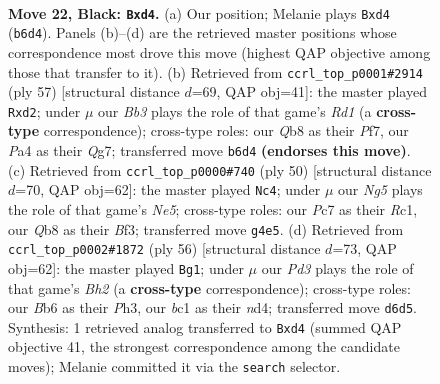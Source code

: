 \documentclass[11pt]{article}
\begin{document}
\clearpage

\begin{figure}[p]\centering
\begin{subfigure}{0.46\textwidth}\centering
\resizebox{\linewidth}{!}{%
\newchessgame
\chessboard[
  setfen={rq6/2p2kpp/1b1p4/8/pP1NQ1n1/2P5/P4PPP/1RB2K2 b - - 0 22},
  showmover=false,
  pgfstyle=straightmove, color=movearrow, markmove={b6-d4}
]}
\caption{}
\end{subfigure}\hfill
\begin{subfigure}{0.46\textwidth}\centering
\resizebox{\linewidth}{!}{%
\newchessgame
\chessboard[
  setfen={3r4/5pqk/p1n1bp1p/1p6/8/1P2QN1P/PB1R2P1/7K b - - 0 29},
  showmover=false,
  pgfstyle=straightmove, color=movearrow, markmove={d8-d2}
]}
\caption{}
\end{subfigure}
\\[4pt]
\begin{subfigure}{0.46\textwidth}\centering
\resizebox{\linewidth}{!}{%
\newchessgame
\chessboard[
  setfen={4r1k1/ppq2pp1/5n1p/2P1Nb2/3Q1P2/5B1P/P5P1/2R3K1 w - - 1 26},
  showmover=false,
  pgfstyle=straightmove, color=movearrow, markmove={e5-c4}
]}
\caption{}
\end{subfigure}\hfill
\begin{subfigure}{0.46\textwidth}\centering
\resizebox{\linewidth}{!}{%
\newchessgame
\chessboard[
  setfen={1b1r4/4q1pk/Q2N4/2P1pp2/1P1n3p/7P/P5PB/R4K2 w - - 2 29},
  showmover=false,
  pgfstyle=straightmove, color=movearrow, markmove={h2-g1}
]}
\caption{}
\end{subfigure}
\caption{\textbf{Move 22, Black: \texttt{Bxd4}.} (a) Our position; Melanie plays \texttt{Bxd4} (\texttt{b6d4}). Panels (b)--(d) are the retrieved master positions whose correspondence most drove this move (highest QAP objective among those that transfer to it). (b) Retrieved from \texttt{ccrl\_top\_p0001\#2914} (ply 57) [structural distance $d$=69, QAP obj=41]: the master played \texttt{Rxd2}; under $\mu$ our \emph{Bb3} plays the role of that game's \emph{Rd1} (a \textbf{cross-type} correspondence); cross-type roles: our \emph{Q}b8 as their \emph{P}f7, our \emph{P}a4 as their \emph{Q}g7; transferred move \texttt{b6d4} \textbf{(endorses this move)}. (c) Retrieved from \texttt{ccrl\_top\_p0000\#740} (ply 50) [structural distance $d$=70, QAP obj=62]: the master played \texttt{Nc4}; under $\mu$ our \emph{Ng5} plays the role of that game's \emph{Ne5}; cross-type roles: our \emph{P}c7 as their \emph{R}c1, our \emph{Q}b8 as their \emph{B}f3; transferred move \texttt{g4e5}. (d) Retrieved from \texttt{ccrl\_top\_p0002\#1872} (ply 56) [structural distance $d$=73, QAP obj=62]: the master played \texttt{Bg1}; under $\mu$ our \emph{Pd3} plays the role of that game's \emph{Bh2} (a \textbf{cross-type} correspondence); cross-type roles: our \emph{B}b6 as their \emph{P}h3, our \emph{b}c1 as their \emph{n}d4; transferred move \texttt{d6d5}. Synthesis: 1 retrieved analog transferred to \texttt{Bxd4} (summed QAP objective 41, the strongest correspondence among the candidate moves); Melanie committed it via the \texttt{search} selector.}
\label{fig:thought-m43}
\end{figure}
\end{document}
